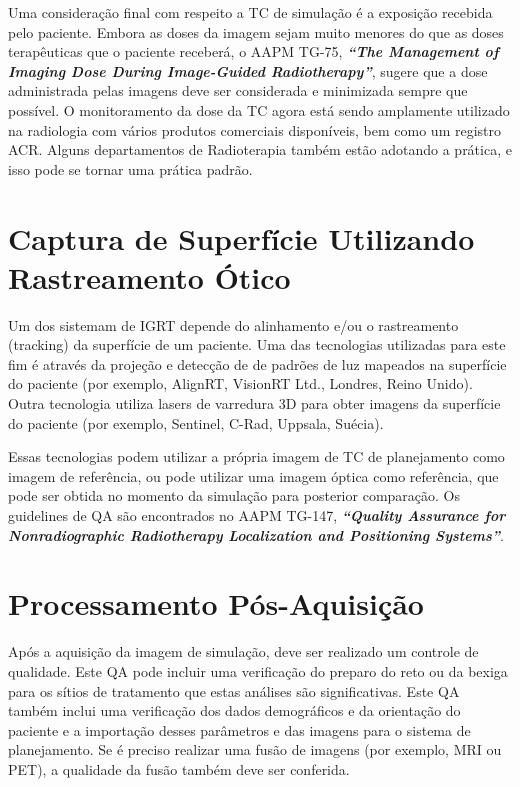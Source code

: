 \documentclass[11pt,a4paper]{article}
\newcounter{exemplo}
\begin{document}
	Uma consideração final com respeito a TC de simulação é a exposição recebida pelo paciente. Embora as doses da imagem sejam muito menores do que as doses terapêuticas que o paciente receberá, o AAPM TG-75, \textbf{\textit{``The Management of Imaging Dose During Image-Guided Radiotherapy''}}, sugere que a dose administrada pelas imagens deve ser considerada e minimizada sempre que possível. O monitoramento da dose da TC agora está sendo amplamente utilizado na radiologia com vários produtos comerciais disponíveis, bem como um registro ACR. Alguns departamentos de Radioterapia também estão adotando a prática, e isso pode se tornar uma prática padrão.

\section{Captura de Superfície Utilizando Rastreamento Ótico}

	Um dos sistemam de IGRT depende do alinhamento e/ou o rastreamento (tracking) da superfície de um paciente. Uma das tecnologias utilizadas para este fim é através da projeção e detecção de de padrões de luz mapeados na superfície do paciente (por exemplo, AlignRT, VisionRT Ltd., Londres, Reino Unido). Outra tecnologia utiliza lasers de varredura 3D para obter imagens da superfície do paciente (por exemplo, Sentinel, C-Rad, Uppsala, Suécia).
	
	Essas tecnologias podem utilizar a própria imagem de TC de planejamento como imagem de referência, ou pode utilizar uma imagem óptica como referência, que  pode ser obtida no momento da simulação para posterior comparação. Os guidelines de QA são encontrados no AAPM TG-147, \textit{\textbf{``Quality Assurance for Nonradiographic Radiotherapy Localization and 	Positioning Systems''}}.

\section{Processamento Pós-Aquisição}

	Após a aquisição da imagem de simulação, deve ser realizado um controle de qualidade. Este QA pode incluir uma verificação do preparo do reto ou da bexiga para os sítios de tratamento que estas análises são significativas. Este QA também inclui uma verificação dos dados demográficos e da orientação do paciente e a importação desses parâmetros e das imagens para o sistema de planejamento. Se é preciso realizar uma fusão de imagens (por exemplo, MRI ou PET), a qualidade da fusão também deve ser conferida.
\end{document}
